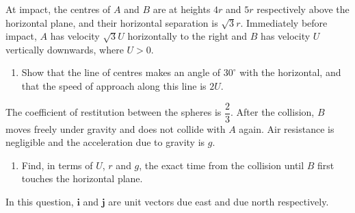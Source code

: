 \documentclass[leqno]{article}
\begin{document}
\begin{enumerate}[
  label=\textbf{\arabic*.},
  leftmargin=*,
  topsep=0pt,
  partopsep=0pt,
  parsep=0pt
]
At impact, the centres of $A$ and $B$ are at heights $4r$ and $5r$ respectively above the horizontal plane, and their horizontal separation is $\sqrt{3}r$. Immediately before impact, $A$ has velocity $\sqrt{3}U$ horizontally to the right and $B$ has velocity $U$ vertically downwards, where $U>0$. \\
\begin{enumerate}[label=\textbf{(\alph*)}]
\item Show that the line of centres makes an angle of $30^\circ$ with the horizontal, and that the speed of approach along this line is $2U$.  \\
\end{enumerate}
The coefficient of restitution between the spheres is $\dfrac{2}{3}$. After the collision, $B$ moves freely under gravity and does not collide with $A$ again. Air resistance is negligible and the acceleration due to gravity is $g$. \\
\begin{enumerate}[label=\textbf{(\alph*)}, resume]
\item Find, in terms of $U$, $r$ and $g$, the exact time from the collision until $B$ first touches the horizontal plane.  \\
\end{enumerate}

\newpage

\questionitem

In this question, $\mathbf{i}$ and $\mathbf{j}$ are unit vectors due east and due north respectively. \\


\end{enumerate}
\end{document}
